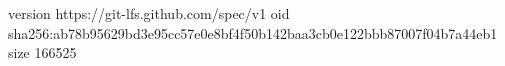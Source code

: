 version https://git-lfs.github.com/spec/v1
oid sha256:ab78b95629bd3e95cc57e0e8bf4f50b142baa3cb0e122bbb87007f04b7a44eb1
size 166525
